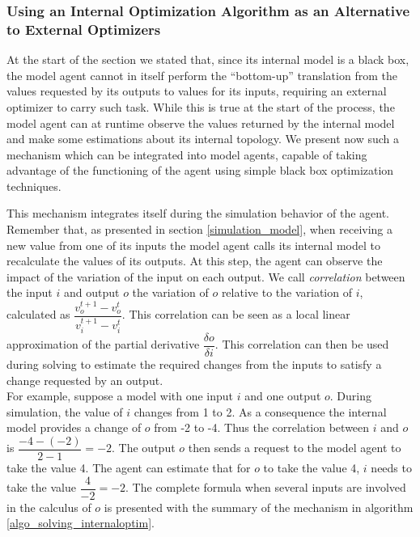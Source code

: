 \subsubsection*{Using an Internal Optimization Algorithm as an Alternative to External Optimizers}

At the start of the section we stated that, since its internal model is a black box, the model agent cannot in itself perform the \enquote{bottom-up} translation from the values requested by its outputs to values for its inputs, requiring an external optimizer to carry such task. While this is true at the start of the process, the model agent can at runtime observe the values returned by the internal model and make some estimations about its internal topology. We present now such a mechanism which can be integrated into model agents, capable of taking advantage of the functioning of the agent using simple black box optimization techniques.

This mechanism integrates itself during the simulation behavior of the agent. Remember that, as presented in section \ref{simulation_model}, when receiving a new value from one of its inputs the model agent calls its internal model to recalculate the values of its outputs. At this step, the agent can observe the impact of the variation of the input on each output. We call \emph{correlation} between the input $i$ and output $o$ the variation of $o$ relative to the variation of $i$, calculated as $\dfrac{v_o^{t+1} - v_o^t}{v_i^{t+1} - v_i^t}$. This correlation can be seen as a local linear approximation of the partial derivative $\dfrac{\delta o}{\delta i}$. This correlation can then be used during solving to estimate the required changes from the inputs to satisfy a change requested by an output.\\
For example, suppose a model with one input $i$ and one output $o$. During simulation, the value of $i$ changes from 1 to 2. As a consequence the internal model provides a change of $o$ from -2 to -4. Thus the correlation between $i$ and $o$ is $\dfrac{-4 - (-2)}{2 - 1} = -2$. The output $o$ then sends a request to the model agent to take the value 4. The agent can estimate that for $o$ to take the value 4, $i$ needs to take the value $\dfrac{4}{-2} = -2$.
The complete formula when several inputs are involved in the calculus of $o$ is presented with the summary of the mechanism in algorithm \ref{algo_solving_internaloptim}.

